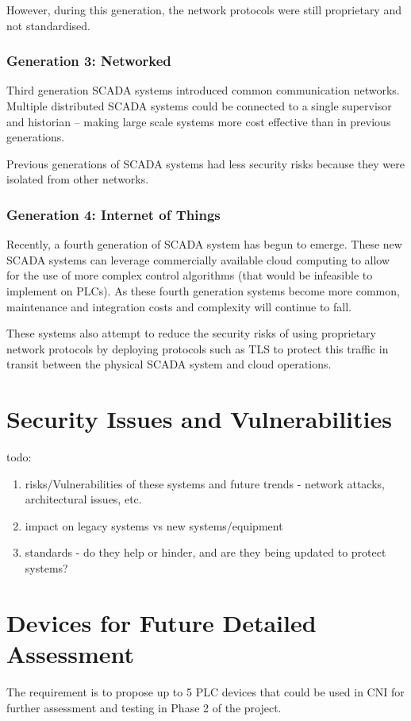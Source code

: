 \documentclass[12pt]{article}
\newenvironment{todoenv}
  {\color{red}todo:}
  {\color{black}}
\begin{document}
However, during this generation, the network protocols were still proprietary and not standardised.
\subsubsection*{Generation 3: Networked}
Third generation SCADA systems introduced common communication networks. Multiple distributed SCADA systems could be connected to a single supervisor and historian -- making large scale systems more cost effective than in previous generations.

Previous generations of SCADA systems had less security risks because they were isolated from other networks.
\subsubsection*{Generation 4: Internet of Things}
Recently, a fourth generation of SCADA system has begun to emerge. These new SCADA systems can leverage commercially available cloud computing to allow for the use of more complex control algorithms (that would be infeasible to implement on PLCs). As these fourth generation systems become more common, maintenance and integration costs and complexity will continue to fall.

These systems also attempt to reduce the security risks of using proprietary network protocols by deploying protocols such as TLS to protect this traffic in transit between the physical SCADA system and cloud operations.

\pagebreak
\section{Security Issues and Vulnerabilities}
\begin{todoenv}
  \begin{enumerate}[label=(\alph*)]
    \item risks/Vulnerabilities of these systems and future trends - network attacks, architectural issues, etc.
    \item impact on legacy systems vs new systems/equipment
    \item standards - do they help or hinder, and are they being updated to protect systems?
  \end{enumerate}
\end{todoenv}

\pagebreak
\section{Devices for Future Detailed Assessment}
The requirement is to propose up to 5 PLC devices that could be used in CNI for further assessment and testing in Phase 2 of the project.
\end{document}
